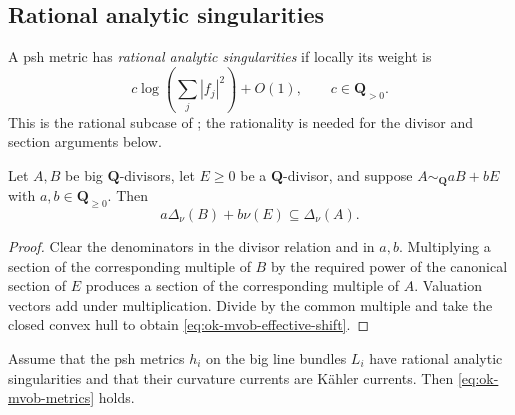 \subsection{Rational analytic singularities}

\begin{definition}\label{def:ok-rational-analytic}
A psh metric has \emph{rational analytic singularities} if locally its
weight is
\[
 c\log\!\left(\sum_j|f_j|^2\right)+O(1),\qquad c\in\mathbf Q_{>0}.
\]
This is the rational subcase of
; the rationality is needed for
the divisor and section arguments below.
\end{definition}

\begin{lemma}\label{lem:ok-mvob-effective-shift}
Let \(A,B\) be big \(\mathbf Q\)-divisors, let \(E\geq0\) be a
\(\mathbf Q\)-divisor, and suppose
\(A\sim_{\mathbf Q}aB+bE\) with \(a,b\in\mathbf Q_{\geq0}\).  Then
\[
 a\Delta_\nu(B)+b\nu(E)\subseteq\Delta_\nu(A).
\tag{55.40}\label{eq:ok-mvob-effective-shift}
\]
\end{lemma}

\begin{proof}
Clear the denominators in the divisor relation and in \(a,b\).  Multiplying
a section of the corresponding multiple of \(B\) by the required power of
the canonical section of \(E\) produces a section of the corresponding
multiple of \(A\).  Valuation vectors add under multiplication.  Divide by
the common multiple and take the closed convex hull to obtain
\eqref{eq:ok-mvob-effective-shift}.
\end{proof}

\begin{proposition}\label{prop:ok-mvob-analytic-case}
Assume that the psh metrics \(h_i\) on the big line bundles \(L_i\) have
rational analytic singularities and that their curvature currents are
K\"ahler currents.  Then \eqref{eq:ok-mvob-metrics} holds.
\end{proposition}

